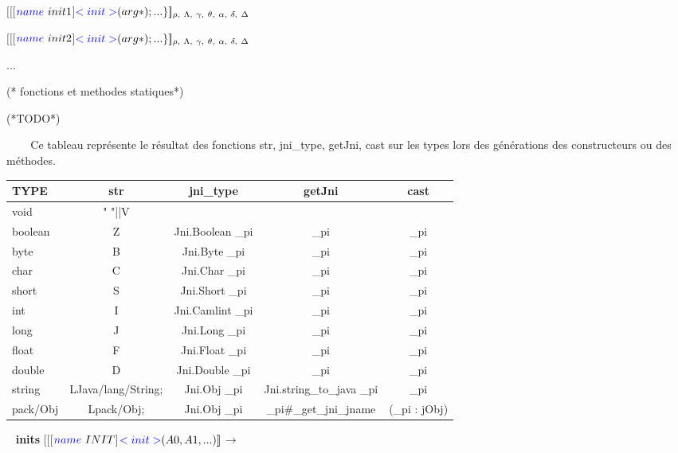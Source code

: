 \documentclass[a4paper, 11pt, notitlepage]{article}
\begin{document}
$[\![$[$ {\color{blue}name}\ init1 $]${\color{blue} <init>} (arg*); ...\}
]\!]_{\rho,\ \Lambda,\ \gamma,\ \theta,\ \alpha,\ \delta,\ \Delta}$

$[\![$[$ {\color{blue}name}\ init2 $]${\color{blue} <init>} (arg*); ...\}
]\!]_{\rho,\ \Lambda,\ \gamma,\ \theta,\ \alpha,\ \delta,\ \Delta}$

...
\begin{OCaml}
(* fonctions et  methodes statiques*)
 
    (*TODO*)

\end{OCaml}


\
\ 
\newline
\ 
\newline
Ce tableau représente le résultat des fonctions str, jni\_type, getJni, cast sur les types lors des générations des constructeurs ou des méthodes.

\noindent
\begin{tabular}{|l|c|c|c|c|}
  \hline
  TYPE & str & jni\_type & getJni & cast \\
  \hline
  void & " "||V & & & \\
  boolean & Z & Jni.Boolean \_pi & \_pi  & \_pi \\
  byte & B & Jni.Byte \_pi & \_pi & \_pi \\
  char & C & Jni.Char \_pi & \_pi & \_pi \\
  short & S & Jni.Short \_pi & \_pi & \_pi  \\
  int & I & Jni.Camlint \_pi & \_pi &  \_pi \\
  long & J & Jni.Long \_pi &\_pi  & \_pi \\
  float & F & Jni.Float \_pi & \_pi & \_pi \\
  double & D & Jni.Double \_pi & \_pi & \_pi \\
  string &LJava/lang/String;& Jni.Obj \_pi & Jni.string\_to\_java \_pi & \_pi \\
  pack/Obj& Lpack/Obj;& Jni.Obj \_pi & \_pi\#\_get\_jni\_jname & (\_pi : jObj) \\
  \hline
\end{tabular}
\ 
\newline
\noindent
\textbf{ inits }
\newline
\noindent
$[\![$[$ {\color{blue}name}\ INIT $]${\color{blue} <init>} (A0,
    A1, ...)]\!]_{}$$\longrightarrow$
% 
\end{document}
